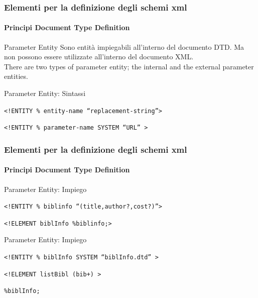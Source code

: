\begin{frame}
    \frametitle{Elementi per la definizione degli schemi xml}
    \framesubtitle{Principi Document Type Definition}
    \addtocounter{nframe}{1}

    \begin{block}{Parameter Entity}
        Sono entità impiegabili all'interno del documento DTD. Ma non possono essere utilizzate all'interno del documento XML.
        \\ There are two types of parameter entity; the internal and the external parameter entities.
    \end{block}

    \begin{block}{Parameter Entity: Sintassi}
        \begin{center}\texttt{<!ENTITY \% entity-name ``replacement-string''>}\end{center}
        \begin{center}\texttt{<!ENTITY \% parameter-name SYSTEM ``URL'' >}\end{center}
    \end{block}
\end{frame}

\begin{frame}
    \frametitle{Elementi per la definizione degli schemi xml}
    \framesubtitle{Principi Document Type Definition}
    \addtocounter{nframe}{1}

    \begin{block}{Parameter Entity: Impiego}
    \begin{center}\texttt{<!ENTITY \% biblinfo ``(title,author?,cost?)''>}\end{center}
    \begin{center}\texttt{<!ELEMENT biblInfo \%biblinfo;>}\end{center}
    \end{block}

    \begin{block}{Parameter Entity: Impiego}
        \begin{center}\texttt{<!ENTITY \% biblInfo SYSTEM ``biblInfo.dtd'' >}\end{center}
        \begin{center}\texttt{<!ELEMENT listBibl (bib+) >}\end{center}
        \begin{center}\texttt{\%biblInfo;}\end{center}
    \end{block}
\end{frame}


